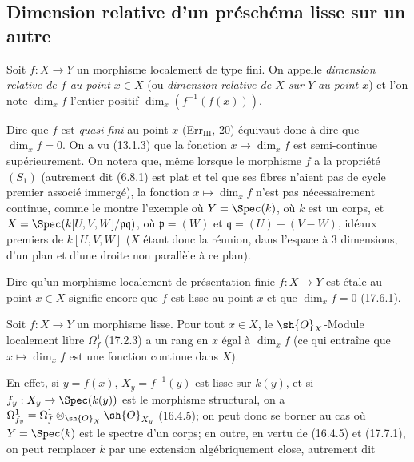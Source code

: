\subsection{Dimension relative d'un préschéma lisse sur un autre}

\begin{definition}[17.10.1]
Soit $f:X\to Y$ un morphisme localement de type fini. On appelle \emph{dimension relative de $f$ au point $x\in X$} (ou \emph{dimension relative de $X$ sur $Y$ au point $x$}) et l'on note $\dim_x f$ l'entier positif $\dim_x(f^{-1}(f(x)))$.
\end{definition}

Dire que $f$ est \emph{quasi-fini} au point $x$ (Err$_{\mathrm{III}}$, 20) équivaut donc à dire que $\dim_x f=0$. On a vu (13.1.3) que la fonction $x\mapsto\dim_x f$ est semi-continue supérieurement. On notera que, même lorsque le morphisme $f$ a la propriété $(S_1)$ (autrement dit (6.8.1) est plat et tel que ses fibres n'aient pas de cycle premier associé immergé), la fonction $x\mapsto\dim_x f$ n'est pas nécessairement continue, comme le montre l'exemple où $Y=\Spec(k)$, où $k$ est un corps, et $X=\Spec(k[U,V,W]/\mathfrak p\mathfrak q)$, où $\mathfrak p=(W)$ et $\mathfrak q=(U)+(V-W)$, idéaux premiers de $k[U,V,W]$ ($X$ étant donc la réunion, dans l'espace à 3 dimensions, d'un plan et d'une droite non parallèle à ce plan).

Dire qu'un morphisme localement de présentation finie $f:X\to Y$ est étale au point $x\in X$ signifie encore que $f$ est lisse au point $x$ et que $\dim_x f=0$ (17.6.1).

\begin{proposition}[17.10.2]
\label{IV.17.10.2}
Soit $f:X\to Y$ un morphisme lisse. Pour tout $x\in X$, le $\sh{O}_X$-Module localement libre $\Omega_f^1$ (17.2.3) a un rang en $x$ égal à $\dim_x f$ (ce qui entraîne que $x\mapsto\dim_x f$ est une fonction continue dans $X$).
\end{proposition}

En effet, si $y=f(x)$, $X_y=f^{-1}(y)$ est lisse sur $k(y)$, et si $f_y:X_y\to\Spec(k(y))$ est le morphisme structural, on a $\Omega_{f_y}^1=\Omega_f^1\otimes_{\sh{O}_X}\sh{O}_{X_y}$ (16.4.5); on peut donc se borner au cas où $Y=\Spec(k)$ est le spectre d'un corps; en outre, en vertu de (16.4.5) et (17.7.1), on peut remplacer $k$ par une extension algébriquement close, autrement dit

